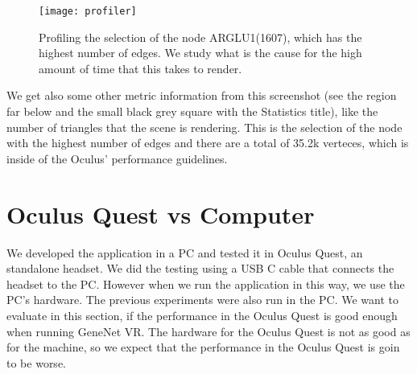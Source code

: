 \begin{figure}
    \centering%
    \texttt{[image: profiler]}
    \caption{Profiling the selection of the node ARGLU1(1607), which has the highest number of edges. We study what is the cause for the high amount of time that this takes to render.}
    \label{fig:profiler}
\end{figure}%

We get also some other metric information from this screenshot (see the region far below and the small black grey square with the Statistics title), like the number of triangles that the scene is rendering. This is the selection of the node with the highest number of edges and there are a total of 35.2k verteces, which is inside of the Oculus' performance guidelines.

%

\section{Oculus Quest vs Computer}
We developed the application in a PC and tested it in Oculus Quest, an standalone headset. We did the testing using a USB C cable that connects the headset to the PC. However when we run the application in this way, we use the PC's hardware. The previous experiments were also run in the PC. We want to evaluate in this section, if the performance in the Oculus Quest is good enough when running GeneNet VR. The hardware for the Oculus Quest is not as good as for the machine, so we expect that the performance in the Oculus Quest is goin to be worse.

